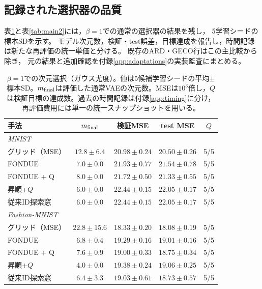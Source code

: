 \documentclass[11pt,a4paper]{ltjsarticle}
\begin{document}
\subsection{記録された選択器の品質}
表\ref{tab:main1}と表\ref{tab:main2}には，$\beta=1$での通常の選択器の結果を残し，
5学習シードの標本SDを示す。
モデル次元数，検証・test誤差，目標達成を報告し，時間記録は新たな再評価の統一単価と分ける。
既存のARD・GECO行はこの主比較から除き，
元の結果と追加確認を付録\ref{app:adaptations}の実装監査にまとめる。

\begin{table}[H]
\caption{$\beta=1$での次元選択（ガウス尤度）。値は5候補学習シードの平均$\pm$標本SD。$m_{\rm final}$は評価した通常VAEの次元数。MSEは$10^3$倍し，$Q$は検証目標の達成数。過去の時間記録は付録\ref{app:timing}に分け，再評価費用には単一の統一スナップショットを用いる。}\label{tab:main1}
\footnotesize
\setlength{\tabcolsep}{3.5pt}
\begin{tabular*}{\textwidth}{@{\extracolsep{\fill}}lcccc@{}}
\toprule
手法 & $m_{\rm final}$ & 検証MSE & test MSE & $Q$ \\
\midrule
\multicolumn{5}{l}{\emph{MNIST}} \\
グリッド（MSE） & $12.8 \pm 6.4$ & $20.98 \pm 0.24$ & $20.50 \pm 0.26$ & 5/5 \\
FONDUE & $7.0 \pm 0.0$ & $21.93 \pm 0.77$ & $21.54 \pm 0.78$ & 5/5 \\
FONDUE + Q & $8.0 \pm 0.0$ & $21.72 \pm 0.50$ & $21.33 \pm 0.55$ & 5/5 \\
昇順+$Q$ & $6.0 \pm 0.0$ & $22.44 \pm 0.15$ & $22.05 \pm 0.17$ & 5/5 \\
従来ID探索窓 & $6.0 \pm 0.0$ & $22.44 \pm 0.15$ & $22.05 \pm 0.17$ & 5/5 \\
\midrule
\multicolumn{5}{l}{\emph{Fashion-MNIST}} \\
グリッド（MSE） & $22.8 \pm 15.6$ & $18.33 \pm 0.20$ & $18.08 \pm 0.19$ & 5/5 \\
FONDUE & $6.8 \pm 0.4$ & $19.29 \pm 0.16$ & $19.01 \pm 0.16$ & 5/5 \\
FONDUE + Q & $7.6 \pm 0.9$ & $19.00 \pm 0.33$ & $18.75 \pm 0.34$ & 5/5 \\
昇順+$Q$ & $4.0 \pm 0.0$ & $19.38 \pm 0.24$ & $19.06 \pm 0.25$ & 5/5 \\
従来ID探索窓 & $6.4 \pm 3.3$ & $19.03 \pm 0.61$ & $18.73 \pm 0.57$ & 5/5 \\
\bottomrule
\end{tabular*}
\end{table}
\end{document}
